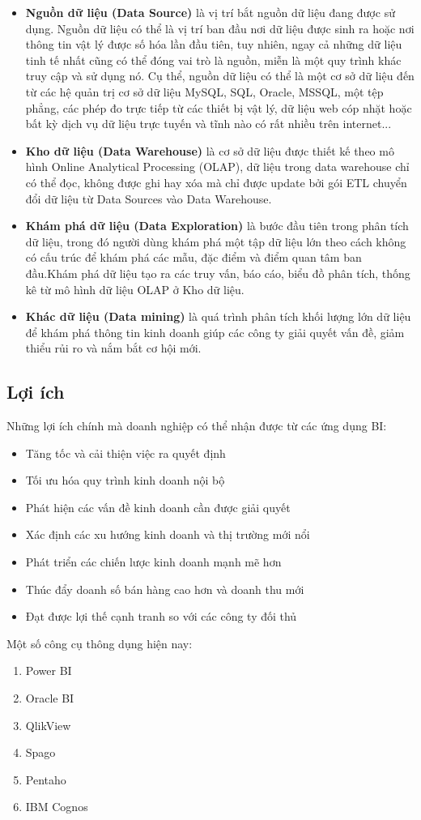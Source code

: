 \begin{itemize}[label=$-$]
    \item \textbf{ Nguồn dữ liệu (Data Source)} là vị trí bắt nguồn dữ liệu đang được sử dụng. 
    Nguồn dữ liệu có thể là vị trí ban đầu nơi dữ liệu được sinh ra hoặc nơi thông tin vật lý được số hóa lần đầu tiên, tuy nhiên, ngay cả những dữ liệu tinh tế nhất cũng có thể đóng vai trò là nguồn, miễn là một quy trình khác truy cập và sử dụng nó. Cụ thể, nguồn dữ liệu có thể là một cơ sở dữ liệu đến từ các hệ quản trị cơ sở dữ liệu MySQL, SQL, Oracle, MSSQL, một tệp phẳng, các phép đo trực tiếp từ các thiết bị vật lý, dữ liệu web cóp nhặt hoặc bất kỳ dịch vụ dữ liệu trực tuyến và tĩnh nào có rất nhiều trên internet...
    \item \textbf{Kho dữ liệu (Data Warehouse)} là cơ sở dữ liệu được thiết kế theo mô hình Online Analytical Processing (OLAP), dữ liệu trong data warehouse chỉ có thể đọc, không được ghi hay xóa mà chỉ được update bởi gói ETL chuyển đổi dữ liệu từ Data Sources vào Data Warehouse.
    \item \textbf{Khám phá dữ liệu (Data Exploration)} là bước đầu tiên trong phân tích dữ liệu, trong đó người dùng khám phá một tập dữ liệu lớn theo cách không có cấu trúc để khám phá các mẫu, đặc điểm và điểm quan tâm ban đầu.Khám phá dữ liệu tạo ra các truy vấn, báo cáo, biểu đồ phân tích, thống kê từ mô hình dữ liệu OLAP ở Kho dữ liệu.
    \item \textbf{Khác dữ liệu (Data mining)} là quá trình phân tích khối lượng lớn dữ liệu để khám phá thông tin kinh doanh giúp các công ty giải quyết vấn đề, giảm thiểu rủi ro và nắm bắt cơ hội mới.
\end{itemize}
\subsection{Lợi ích}
Những lợi ích chính mà doanh nghiệp có thể nhận được từ các ứng dụng BI:
\begin{itemize}[label=$-$]
    \item Tăng tốc và cải thiện việc ra quyết định
    \item Tối ưu hóa quy trình kinh doanh nội bộ
    \item Phát hiện các vấn đề kinh doanh cần được giải quyết
    \item Xác định các xu hướng kinh doanh và thị trường mới nổi
    \item Phát triển các chiến lược kinh doanh mạnh mẽ hơn
    \item Thúc đẩy doanh số bán hàng cao hơn và doanh thu mới
    \item Đạt được lợi thế cạnh tranh so với các công ty đối thủ
\end{itemize}
\newpage
Một số công cụ thông dụng hiện nay:
\begin{enumerate}
    \item Power BI
    \item Oracle BI
    \item QlikView
    \item Spago
    \item Pentaho
    \item IBM Cognos
\end{enumerate}
